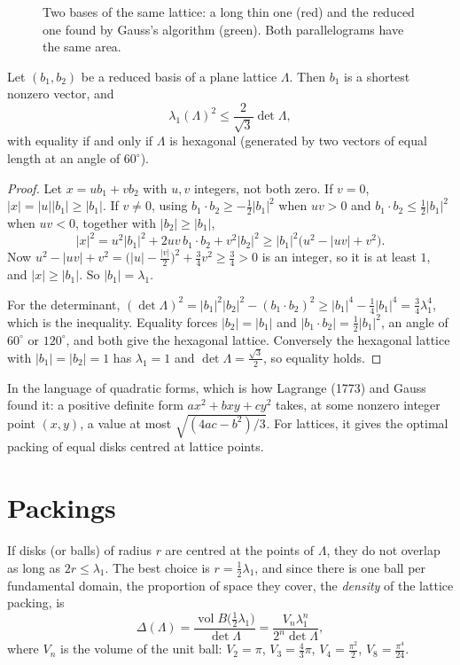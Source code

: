 \begin{figure}[ht]
\centering
{}
\caption{Two bases of the same lattice: a long thin one (red) and the reduced one found by Gauss's algorithm (green). Both parallelograms have the same
area.}
\label{fig:reduction}
\end{figure}

\begin{theorem}\label{thm:hermite2}
Let $(b_1,b_2)$ be a reduced basis of a plane lattice $\Lambda$. Then $b_1$ is a shortest nonzero vector, and
\[
\lambda_1(\Lambda)^2\le\frac2{\sqrt3}\det\Lambda,
\]
with equality if and only if $\Lambda$ is hexagonal (generated by two vectors of equal length at an angle of $60^\circ$).
\end{theorem}

\begin{proof}
Let $x=ub_1+vb_2$ with $u,v$ integers, not both zero. If $v=0$, $|x|=|u||b_1|\ge|b_1|$. If $v\ne0$, using $b_1\cdot b_2\ge-\frac12|b_1|^2$ when $uv>0$ and
$b_1\cdot b_2\le\frac12|b_1|^2$ when $uv<0$, together with $|b_2|\ge|b_1|$,
\[
|x|^2=u^2|b_1|^2+2uv\,b_1\cdot b_2+v^2|b_2|^2\ge|b_1|^2\bigl(u^2-|uv|+v^2\bigr).
\]
Now $u^2-|uv|+v^2=\bigl(|u|-\frac{|v|}2\bigr)^2+\frac34v^2\ge\frac34>0$ is an integer, so it is at least $1$, and $|x|\ge|b_1|$. So $|b_1|=\lambda_1$.

For the determinant, $(\det\Lambda)^2=|b_1|^2|b_2|^2-(b_1\cdot b_2)^2\ge|b_1|^4-\frac14|b_1|^4=\frac34\lambda_1^4$, which is the inequality. Equality forces
$|b_2|=|b_1|$ and $|b_1\cdot b_2|=\frac12|b_1|^2$, an angle of $60^\circ$ or $120^\circ$, and both give the hexagonal lattice. Conversely the hexagonal lattice
with $|b_1|=|b_2|=1$ has $\lambda_1=1$ and $\det\Lambda=\frac{\sqrt3}2$, so equality holds.
\end{proof}

In the language of quadratic forms, which is how Lagrange (1773) and Gauss found it: a positive definite form $ax^2+bxy+cy^2$ takes, at some
nonzero integer point $(x,y)$, a value at most $\sqrt{(4ac-b^2)/3}$. For lattices, it gives the optimal packing of equal disks centred at lattice points.

\section{Packings}

If disks (or balls) of radius $r$ are centred at the points of $\Lambda$, they do not overlap as long as $2r\le\lambda_1$. The best choice is
$r=\frac12\lambda_1$, and since there is one ball per fundamental domain, the proportion of space they cover, the \emph{density} of the lattice packing, is
\[
\Delta(\Lambda)=\frac{\operatorname{vol}B\bigl(\frac12\lambda_1\bigr)}{\det\Lambda}=\frac{V_n\lambda_1^n}{2^n\det\Lambda},
\]
where $V_n$ is the volume of the unit ball: $V_2=\pi$, $V_3=\frac43\pi$, $V_4=\frac{\pi^2}2$, $V_8=\frac{\pi^4}{24}$.


